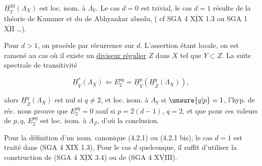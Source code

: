      $\underline H^{2d}_Y(\Lambda_X)$ est loc. isom. à $\Lambda_Y$.  Le cas $d=0$ est trivial, le cas $d=1$ résulte de la théorie de Kummer et du  de Abhyankar absolu,   ( cf SGA 4 $\overline{\underline{\mathrm{XIX}}}$ 1.3 ou SGA 1 $\overline{\underline{\mathrm{XII}}}$ \ldots).

Pour $d>1$, on procède par récurrence sur $d$. L'assertion étant locale, on  est ramené au cas où il existe un \uline{diviseur régulier} $Z$ dans $X$ tel que  $Y\subset Z$.   La suite spectrale de transitivité

\[
\underline H^*_Y(\Lambda_X)\Longleftarrow E^{pq}_2=\underline H^p_Y(\underline H^q_Z(\Lambda_X)),
\]

 alors  $\underline H^q_Z(\Lambda_X)$ est nul si $q\ne 2$, et loc. isom. à $\Lambda_Y$ si $\unsure{q|p}=1$,  l'hyp. de réc. nous prouve que $E^{pq}_2=0$ sauf  si  $p=2(d-1)$, $q=2$, et que pour ces valeurs de $p,q$, $E^{pq}_2$ est loc. isom. à $\Lambda_Z$, d'où la conclusion.

Pour la définition d'un isom. canonique (4.2.1) ou (4.2.1 bis), le cas $d=1$ est traité dans (SGA 4 XIX 1.3),  Pour le cas $d$ quelconque, il suffit d'utiliser la construction de (SGA 4 $\overline{\underline{\mathrm{XIX}}}$ 3.4) ou de (SGA 4 $\overline{\underline{\mathrm{XVIII}}}$\quad).
